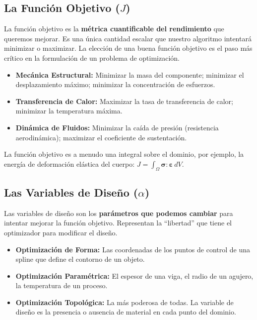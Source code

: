 \subsection{La Función Objetivo (\(J\))}
La función objetivo es la \textbf{métrica cuantificable del rendimiento} que queremos mejorar. Es una única cantidad escalar que nuestro algoritmo intentará minimizar o maximizar. La elección de una buena función objetivo es el paso más crítico en la formulación de un problema de optimización.
\begin{itemize}
    \item \textbf{Mecánica Estructural:} Minimizar la masa del componente; minimizar el desplazamiento máximo; minimizar la concentración de esfuerzos.
    \item \textbf{Transferencia de Calor:} Maximizar la tasa de transferencia de calor; minimizar la temperatura máxima.
    \item \textbf{Dinámica de Fluidos:} Minimizar la caída de presión (resistencia aerodinámica); maximizar el coeficiente de sustentación.
\end{itemize}
La función objetivo es a menudo una integral sobre el dominio, por ejemplo, la energía de deformación elástica del cuerpo: \(J = \int_{\Omega} \bm{\sigma} : \bm{\varepsilon} \, dV\).

\subsection{Las Variables de Diseño (\(\alpha\))}
Las variables de diseño son los \textbf{parámetros que podemos cambiar} para intentar mejorar la función objetivo. Representan la ``libertad'' que tiene el optimizador para modificar el diseño.
\begin{itemize}
    \item \textbf{Optimización de Forma:} Las coordenadas de los puntos de control de una spline que define el contorno de un objeto.
    \item \textbf{Optimización Paramétrica:} El espesor de una viga, el radio de un agujero, la temperatura de un proceso.
    \item \textbf{Optimización Topológica:} La más poderosa de todas. La variable de diseño es la presencia o ausencia de material en cada punto del dominio.
\end{itemize}

